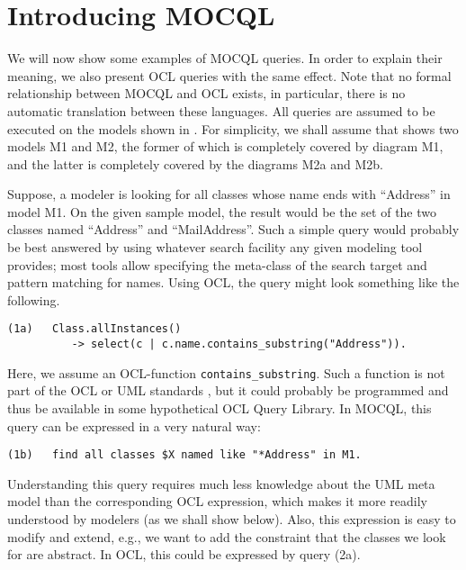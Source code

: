 \documentclass{llncs}
\newcommand{\MMQ}{MOCQL\xspace}
\begin{document}
\section{Introducing \MMQ}\label{sec:Syntax}

We will now show some examples of \MMQ queries. In order to explain their meaning, we also present OCL queries with the same effect. Note that no formal relationship between \MMQ and OCL exists, in particular, there is no automatic translation between these languages. All queries are assumed to be executed on the models shown in . For simplicity, we shall assume that  shows two models M1 and M2, the former of which is completely covered by diagram M1, and the latter is completely covered by the diagrams M2a and M2b. 


Suppose, a modeler is looking for all classes whose name ends with ``Address'' in model M1. On the given sample model, the result would be the set of the two classes named ``Address'' and ``MailAddress''. Such a simple query would probably be best answered by using whatever search facility any given modeling tool provides; most tools allow specifying the meta-class of the search target and pattern matching for names. Using OCL, the query might look something like the following.

\begin{verbatim}
(1a)   Class.allInstances()
          -> select(c | c.name.contains_substring("Address")).
\end{verbatim}

Here, we assume an OCL-function \texttt{contains\_substring}. Such a function is not part of the OCL or UML standards \cite{ocl231,uml24beta}, but it could probably be programmed and thus be available in some hypothetical OCL Query Library. In \MMQ, this query can be expressed in a very natural way:

\begin{verbatim}
(1b)   find all classes $X named like "*Address" in M1.
\end{verbatim}

\noindent Understanding this query requires much less knowledge about the UML meta model than the corresponding OCL expression, which makes it more readily understood by modelers (as we shall show below). Also, this expression is easy to modify and extend, e.g., we want to add the constraint that the classes we look for are abstract. In OCL, this could be expressed by query (2a).
\end{document}
